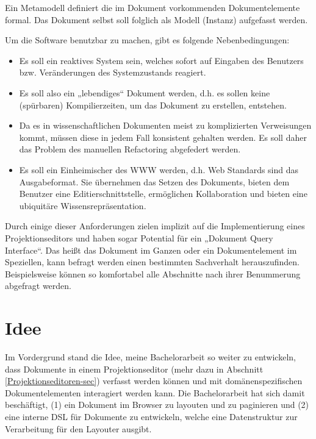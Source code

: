  
Ein Metamodell definiert die im Dokument vorkommenden Dokumentelemente formal. Das Dokument selbst soll folglich als Modell (Instanz) aufgefasst werden.

 
Um die Software benutzbar zu machen, gibt es folgende Nebenbedingungen:

 
\begin{itemize}

\item Es soll ein reaktives System sein, welches sofort auf Eingaben des Benutzers bzw. Veränderungen des Systemzustands reagiert.
\item Es soll also ein „lebendiges“ Dokument werden, d.h. es sollen keine (spürbaren) Kompilierzeiten, um das Dokument zu erstellen, entstehen.
\item Da es in wissenschaftlichen Dokumenten meist zu komplizierten Verweisungen kommt, müssen diese in jedem Fall konsistent gehalten werden. Es soll daher das Problem des manuellen Refactoring abgefedert werden.
\item Es soll ein Einheimischer des WWW werden, d.h. Web Standards sind das Ausgabeformat. Sie übernehmen das Setzen des Dokuments, bieten dem Benutzer eine Editierschnittstelle, ermöglichen Kollaboration und bieten eine ubiquitäre Wissensrepräsentation.
\end{itemize}
 
Durch einige dieser Anforderungen zielen implizit auf die Implementierung eines Projektionseditors und haben sogar Potential für ein „Dokument Query Interface“. Das heißt das Dokument im Ganzen oder ein Dokumentelement im Speziellen, kann befragt werden einen bestimmten Sachverhalt herauszufinden. Beispielsweise können so komfortabel alle Abschnitte nach ihrer Benummerung abgefragt werden.

 
\section{Idee}\label{}
 
Im Vordergrund stand die Idee, meine Bachelorarbeit \citep{Hodapp} so weiter zu entwickeln, dass Dokumente in einem Projektionseditor (mehr dazu in Abschnitt \ref{Projektionseditoren-sec}) verfasst werden können und mit domänenspezifischen Dokumentelementen interagiert werden kann. Die Bachelorarbeit hat sich damit beschäftigt, (1) ein Dokument im Browser zu layouten und zu paginieren und (2) eine interne DSL für Dokumente zu entwickeln, welche eine Datenstruktur zur Verarbeitung für den Layouter ausgibt.

